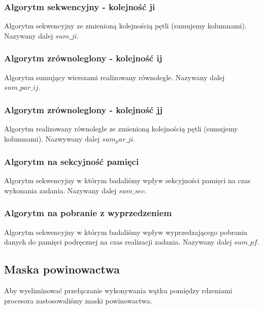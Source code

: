 \subsubsection{Algorytm sekwencyjny - kolejność ji}

Algorytm sekwencyjny ze zmienioną kolejnością pętli (sumujemy kolumnami). Nazywany dalej $sum\_ji$.



\subsubsection{Algorytm zrównoleglony - kolejność ij}

Algorytm sumujący wierszami realizowany równolegle. Nazywany dalej $sum\_par\_ij$.



\subsubsection{Algorytm zrównoleglony - kolejność jj}

Algorytm realizowany równolegle ze zmienioną kolejnością pętli (sumujemy kolumnami). Nazwywany dalej $sum_par\_ji$.



\subsubsection{Algorytm na sekcyjność pamięci}

Algorytm sekwencyjny w którym badaliśmy wpływ sekcyjności pamięci na czas wykonania zadania. Nazywany dalej $sum\_sec$.



\subsubsection{Algorytm na  pobranie  z wyprzedzeniem}

Algorytm sekwencyjny w którym badaliśmy wpływ wyprzedzającego pobrania danych do pamięci podręcznej na czas realizacji zadania. Nazywany dalej $sum\_pf$.


\subsection{Maska powinowactwa}

Aby wyeliminować przełączanie wykonywania wątku pomiędzy rdzeniami procesora zastosowaliśmy maski powinowactwa.

